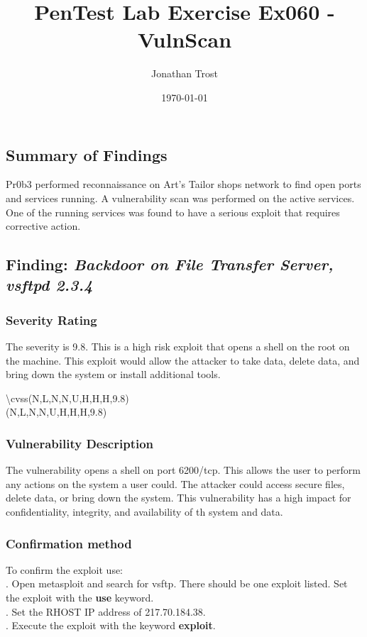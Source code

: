 \documentclass[notitlepage]{article}
\begin{document}
	
	
	\title{PenTest Lab Exercise Ex060 - VulnScan}
	\author{Jonathan Trost}
	\date{\isodate\today}
	
	\maketitle
	
	\tableofcontents
	
	\newpage
	
	\subsection{Summary of Findings}
	\indent Pr0b3 performed reconnaissance on Art's Tailor shops network to find open ports and services running. A vulnerability scan was performed on the active services. One of the running services was found to have a  serious exploit that requires corrective action.  
	
	\subsection{Finding: \emph{Backdoor on File Transfer Server, vsftpd 2.3.4}}
	
	\subsubsection{Severity Rating}
	The severity is 9.8. This is a high risk exploit that opens a shell on the root on the machine.  This exploit would allow the attacker to take data, delete data, and bring down the system or install additional tools.  

	\textbackslash cvss(N,L,N,N,U,H,H,H,9.8)\\
	\cvss(N,L,N,N,U,H,H,H,9.8) \\
	
	\subsubsection{Vulnerability Description}
	The vulnerability opens a shell on port 6200/tcp. This allows the user to perform any actions on the system a user could. The attacker could access secure files, delete data, or bring down the system. This vulnerability has a high impact for confidentiality, integrity, and availability of th system and data. 
	
	\subsubsection{Confirmation method}
	To confirm the exploit use: \\
	. Open metasploit and search for vsftp. There should be one exploit listed. Set the exploit with the \textbf{use} keyword.\\
	. Set the RHOST IP address of 217.70.184.38. \\
	. Execute the exploit with the keyword \textbf{exploit}.\\
	
\end{document}

